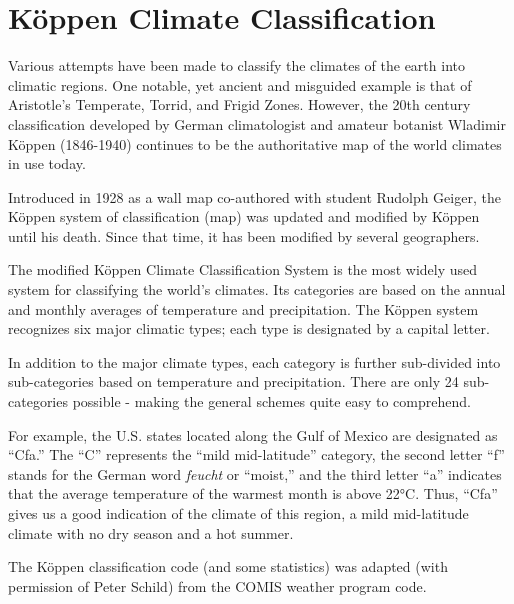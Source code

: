 \section{Köppen Climate Classification}\label{kuxf6ppen-climate-classification}

Various attempts have been made to classify the climates of the earth into climatic regions. One notable, yet ancient and misguided example is that of Aristotle's Temperate, Torrid, and Frigid Zones. However, the 20th century classification developed by German climatologist and amateur botanist Wladimir Köppen (1846-1940) continues to be the authoritative map of the world climates in use today.

Introduced in 1928 as a wall map co-authored with student Rudolph Geiger, the Köppen system of classification (map) was updated and modified by Köppen until his death. Since that time, it has been modified by several geographers.

The modified Köppen Climate Classification System is the most widely used system for classifying the world's climates. Its categories are based on the annual and monthly averages of temperature and precipitation. The Köppen system recognizes six major climatic types; each type is designated by a capital letter.

In addition to the major climate types, each category is further sub-divided into sub-categories based on temperature and precipitation. There are only 24 sub-categories possible - making the general schemes quite easy to comprehend.

For example, the U.S. states located along the Gulf of Mexico are designated as ``Cfa.'' The ``C'' represents the ``mild mid-latitude'' category, the second letter ``f'' stands for the German word \emph{feucht} or ``moist,'' and the third letter ``a'' indicates that the average temperature of the warmest month is above 22°C. Thus, ``Cfa'' gives us a good indication of the climate of this region, a mild mid-latitude climate with no dry season and a hot summer.

The Köppen classification code (and some statistics) was adapted (with permission of Peter Schild) from the COMIS weather program code.

